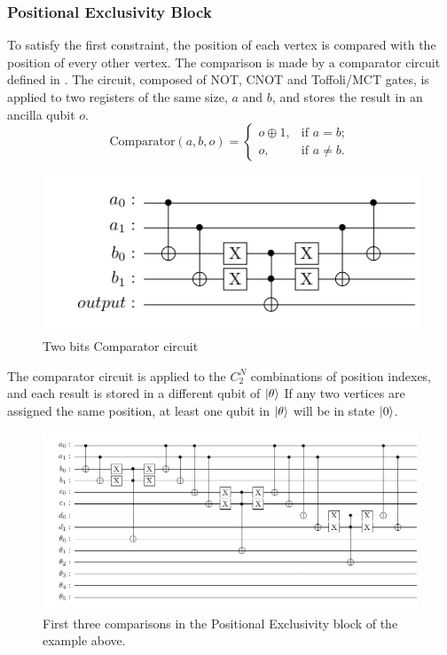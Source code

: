 \documentclass[10pt,a4paper]{article}
\begin{document}
\subsubsection*{Positional Exclusivity Block}
To satisfy the first constraint, the position of each vertex is compared with the position of every other vertex. The comparison is made by a comparator circuit defined in \cite{Coloring1}. The circuit, composed of NOT, CNOT and Toffoli/MCT gates, is applied to two registers of the same size, $a$ and $b$, and  stores the result in an ancilla qubit $o$.
$$\text{Comparator}(a, b, o) =
\begin{cases}
o \oplus 1, & \text{if } a = b; \\
o, & \text{if } a \neq b.
\end{cases}$$
\begin{figure}[hbtp]
\centering
\includegraphics[scale=0.5]{figures/comparator.pdf}
\caption{Two bits Comparator circuit}
\end{figure}

The comparator circuit is applied to the $C^N_2$ combinations of position indexes, and each result is stored in a different qubit of $\ket{\theta}$ If any two vertices are assigned the same position, at least one qubit in $\ket{\theta}$ will be in state $\ket{0}$.

\begin{figure}[hbtp]
\centering
\includegraphics[scale=0.5]{figures/comparator_extended.pdf}
\caption{First three comparisons in the Positional Exclusivity block of the example above.}
\end{figure}
\end{document}
